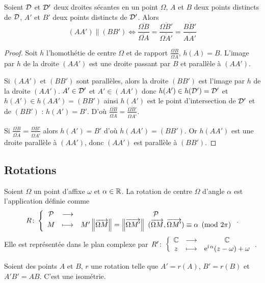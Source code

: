 \begin{theo}
  Soient \(\mathcal{D}\) et \(\mathcal{D}'\) deux droites sécantes en un point \(\Omega\), \(A\) et \(B\) deux points distincts de \(\mathcal{D}\), \(A'\) et \(B'\) deux points distincts de \(\mathcal{D}'\). Alors
  \begin{equation}
    (AA') \parallel (BB') \iff \frac{\overline{\Omega B}}{\overline{\Omega A}}=\frac{\overline{\Omega B'}}{\overline{\Omega A'}}=\frac{\overline{BB'}}{\overline{AA'}}
  \end{equation}
\end{theo}
\begin{proof}
  Soit \(h\) l'homothétie de centre \(\Omega\) et de rapport \(\frac{\overline{\Omega B}}{\overline{\Omega A}}\), \(h(A)=B\). L'image par \(h\) de la droite \((AA')\) est une droite passant par \(B\) et parallèle à \((AA')\).

Si \((AA')\) et \((BB')\) sont parallèles, alors la droite \((BB')\) est l'image par \(h\) de la droite \((AA')\). \(A' \in \mathcal{D}'\) et \(A' \in (AA')\) donc \(h(A') \in h(\mathcal{D}')=\mathcal{D}'\) et \(h(A') \in h(AA') = (BB')\) ainsi \(h(A')\) est le point d'intersection de \(\mathcal{D}'\) et de \((BB')\) : \(h(A')=B'\). D'où \(\frac{\overline{\Omega B}}{\overline{\Omega A}}=\frac{\overline{\Omega B'}}{\overline{\Omega A'}}\).

Si \(\frac{\overline{\Omega B}}{\overline{\Omega A}}=\frac{\overline{\Omega B'}}{\overline{\Omega A'}}\) alors \(h(A')=B'\) d'où \(h(AA')=(BB')\). Or \(h(AA')\) est une droite parallèle à \((AA')\), donc \((AA')\) est parallèle à \((BB')\).
\end{proof}

\subsection{Rotations}

\begin{defdef}
  Soient \(\Omega\) un point d'affixe \(\omega\) et \(\alpha \in \mathbb{R}\). La rotation de centre \(\Omega\) d'angle \(\alpha\) est l'application définie comme 
\begin{equation}
R\colon \left\{\begin{array}{ccc} \mathcal{P} & \longrightarrow &\mathcal{P}\\ M & \longmapsto & M' \left\lVert\overrightarrow{\Omega M}\right\rVert= \left\lVert\overrightarrow{\Omega M'}\right\rVert \ (\overrightarrow{\Omega M},\overrightarrow{\Omega M'}) \equiv \alpha \pmod {2\pi} \end{array} \right..
\end{equation}
 Elle est représentée dans le plan complexe par \(R'\colon \left\{\begin{array}{ccc} \mathbb{C} & \longrightarrow &\mathbb{C}\\ z & \longmapsto & \operatorname{e}^{\operatorname{i} \alpha}(z-\omega) + \omega \end{array} \right.\).
\end{defdef}
\begin{prop}
  Soient des points \(A\) et \(B\), \(r\) une rotation telle que \(A'=r(A)\), \(B'=r(B)\) et \(A'B'=AB\). C'est une isométrie.
\end{prop}

